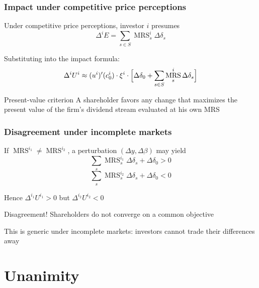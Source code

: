 \documentclass[blue]{beamer}
\DeclareMathOperator\MRS{MRS}
\theoremstyle{definition}
\theoremstyle{example}
\begin{document}
\begin{frame}\frametitle{Impact under competitive price perceptions}
Under competitive price perceptions, investor $i$ presumes
\begin{equation*}
\Delta^i E = \sum_{s \in S} \MRS^i_s \Delta \delta_s
\end{equation*}
\bigskip

Substituting into the impact formula:
\begin{equation*}
\Delta^i U^i \approx (u^i)'(c^i_0) \cdot \xi^i \cdot \Bigl[ \Delta \delta_0 + \sum_{s \in S} \MRS^i_s \Delta \delta_s \Bigr]
\end{equation*}
\bigskip

\begin{block}{Present-value criterion}
A shareholder favors any change that maximizes the present value of the firm's dividend stream evaluated at his own MRS
\end{block}
\end{frame}

\begin{frame}\frametitle{Disagreement under incomplete markets}
If $\MRS^{i_1} \neq \MRS^{i_2}$, a perturbation $(\Delta y, \Delta \beta)$ may yield
\begin{equation*}
\sum_{s} \MRS^{i_1}_s \Delta \delta_s + \Delta \delta_0 > 0
\end{equation*}
\begin{equation*}
\sum_{s} \MRS^{i_2}_s \Delta \delta_s + \Delta \delta_0 < 0
\end{equation*}
\bigskip

Hence $\Delta^{i_1} U^{i_1} > 0$ but $\Delta^{i_2} U^{i_2} < 0$
\bigskip

\alert{Disagreement!} Shareholders do not converge on a common objective
\bigskip

This is generic under incomplete markets: investors cannot trade their differences away
\end{frame}

\section{Unanimity}
\end{document}
